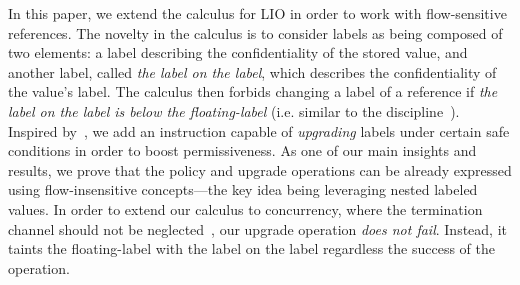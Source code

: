 In this paper, we extend the calculus for LIO in order to work with
flow-sensitive references.
The novelty in the calculus is to consider labels as being composed of two
elements: a label describing the confidentiality of the stored value, and
another label, called \emph{the label on the label}, which describes the
confidentiality of the value's label. The calculus then forbids changing a
label of a reference if \emph{the label on the label is below the
  floating-label} (i.e. similar to the {\nsu}
discipline~\citep{Austin:Flanagan:PLAS10}). Inspired by~\citep{Hedin13}, we add
an instruction capable of \emph{upgrading} labels under certain safe conditions in
order to boost permissiveness. As one of our main insights and results, we prove
that the policy {\nsu} and upgrade operations can be already expressed using
flow-insensitive concepts---the key idea being leveraging nested labeled
values.  In order to extend our calculus to concurrency, where the termination
channel should not be neglected~\citep{stefan:addressing-covert}, our upgrade
operation \emph{does not fail}. Instead, it taints the floating-label with the
label on the label regardless the success of the operation.

